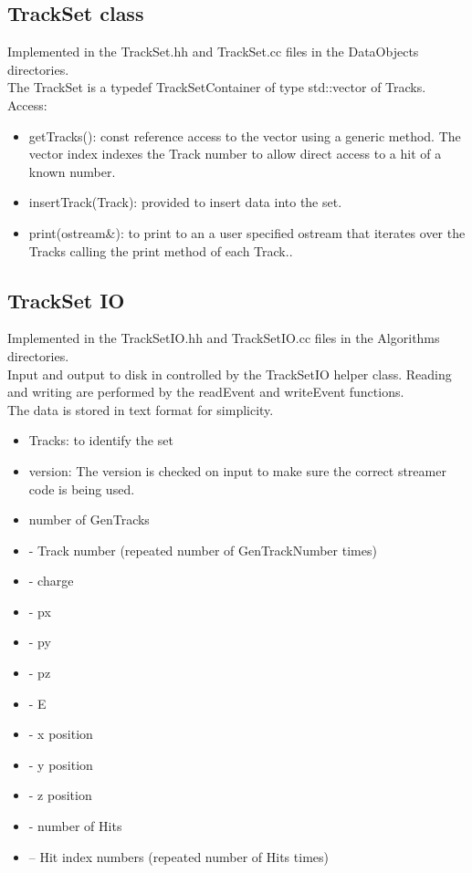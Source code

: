 \documentclass[aps,prd,superscriptaddress,floatfix]{revtex4}
\begin{document}
\subsection{TrackSet class}
Implemented in the TrackSet.hh and TrackSet.cc files in the DataObjects directories.
\\

The TrackSet is a typedef TrackSetContainer of type std::vector of Tracks.
\\

Access:
\begin{itemize}
\item getTracks(): const reference access to the vector using a generic method.
The vector index indexes the Track number to allow direct access to a hit of a known number.

\item insertTrack(Track): provided to insert data into the set.


\item print(ostream\&): to print to an a user specified ostream that iterates over
the Tracks calling the print method of each Track..
\end{itemize}


\subsection{TrackSet IO}
Implemented in the TrackSetIO.hh and TrackSetIO.cc files in the Algorithms directories.
\\

Input and output to disk in controlled by the TrackSetIO helper class.  Reading and writing
are performed by the readEvent and writeEvent functions.
\\

The data is stored in text format for simplicity.

\begin{itemize}
\item Tracks: to identify the set
\item version: The version is checked on input to make sure the correct streamer code is being used.
\item number of GenTracks
\item - Track number (repeated number of GenTrackNumber times)
\item - charge
\item - px
\item - py
\item - pz
\item - E
\item - x position
\item - y position
\item - z position
\item - number of Hits
\item -- Hit index numbers (repeated number of Hits times)
\end{itemize}
\end{document}
